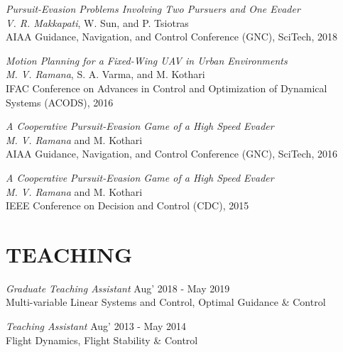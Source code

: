 \documentclass[margin, 10pt]{res} %
\newcommand{\ak}[1]{\textcolor{blue}{#1}}
\begin{document}
\begin{resume}
{\sl Pursuit-Evasion Problems Involving Two Pursuers and One Evader} \\ 
\textit{V. R. Makkapati}, W. Sun, and P. Tsiotras \\
AIAA Guidance, Navigation, and Control Conference (GNC), SciTech, 2018

{\sl Motion Planning for a Fixed-Wing UAV in Urban Environments} \\
\textit{M. V. Ramana}, S. A. Varma, and M. Kothari \\
IFAC Conference on Advances in Control and Optimization of Dynamical Systems (ACODS), 2016

{\sl A Cooperative Pursuit-Evasion Game of a High Speed Evader} \\
\textit{M. V. Ramana} and M. Kothari \\
AIAA Guidance, Navigation, and Control Conference (GNC), SciTech, 2016

{\sl A Cooperative Pursuit-Evasion Game of a High Speed Evader} \\
\textit{M. V. Ramana} and M. Kothari \\
IEEE Conference on Decision and Control (CDC), 2015




\section{TEACHING}

{\sl Graduate Teaching Assistant} \hfill Aug' 2018 - May 2019\\
Multi-variable Linear Systems and Control, Optimal Guidance \& Control

{\sl Teaching Assistant} \hfill Aug' 2013 - May 2014\\
Flight Dynamics, Flight Stability \& Control


\end{resume}
\end{document}
